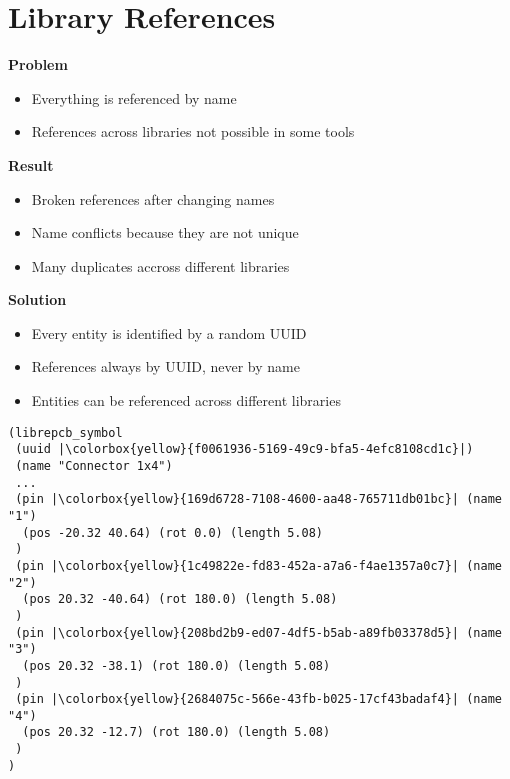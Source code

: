 \section{Library References}

\begin{frame}{\secname}
  \textbf{Problem}
  \begin{itemize}
    \item Everything is referenced by name
    \item References across libraries not possible in some tools
  \end{itemize}

  \pause

  \textbf{Result}
  \begin{itemize}
    \item Broken references after changing names
    \item Name conflicts because they are not unique
    \item Many duplicates accross different libraries
  \end{itemize}

  \pause

  \textbf{Solution}
  \begin{itemize}
    \item Every entity is identified by a random UUID
    \item References always by UUID, never by name
    \item Entities can be referenced across different libraries
  \end{itemize}
\end{frame}

\begin{frame}[fragile]{\secname}
  \begin{verbatim}
(librepcb_symbol
 (uuid |\colorbox{yellow}{f0061936-5169-49c9-bfa5-4efc8108cd1c}|)
 (name "Connector 1x4")
 ...
 (pin |\colorbox{yellow}{169d6728-7108-4600-aa48-765711db01bc}| (name "1")
  (pos -20.32 40.64) (rot 0.0) (length 5.08)
 )
 (pin |\colorbox{yellow}{1c49822e-fd83-452a-a7a6-f4ae1357a0c7}| (name "2")
  (pos 20.32 -40.64) (rot 180.0) (length 5.08)
 )
 (pin |\colorbox{yellow}{208bd2b9-ed07-4df5-b5ab-a89fb03378d5}| (name "3")
  (pos 20.32 -38.1) (rot 180.0) (length 5.08)
 )
 (pin |\colorbox{yellow}{2684075c-566e-43fb-b025-17cf43badaf4}| (name "4")
  (pos 20.32 -12.7) (rot 180.0) (length 5.08)
 )
)
  \end{verbatim}
\end{frame}

